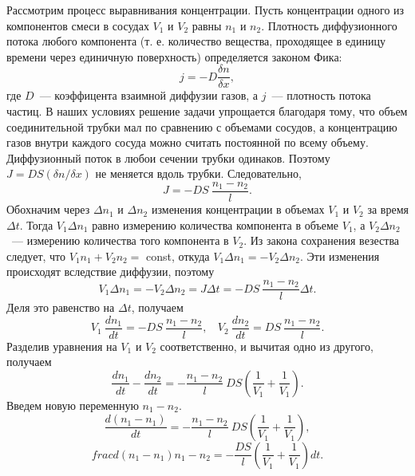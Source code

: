 \documentclass[a4paper,11pt]{article}
\begin{document}
Рассмотрим процесс выравнивания концентрации. Пусть концентрации одного из компонентов смеси в сосудах $V_{1}$ и $V_{2}$ равны $n_{1}$ и $n_{2}$. Плотность диффузионного потока любого компонента (т. е. количество вещества, проходящее в единицу времени через единичную поверхность) определяется законом Фика:
\begin{equation}\label{eq1}
  j = -D \frac{\delta n}{\delta x},
\end{equation}
где $D$~--- коэффицента взаимной диффузии газов, а $j$~--- плотность потока частиц. В наших условиях решение задачи упрощается благодаря тому, что объем соединительной трубки мал по сравнению с объемами сосудов, а концентрацию газов внутри каждого сосуда можно считать постоянной по всему объему. Диффузионный поток в любои сечении трубки одинаков. Поэтому $J = DS(\delta n/\delta x)$ не меняется вдоль трубки. Следовательно,
\begin{equation}\label{eq2}
  J = -DS\ \frac{n_{1} - n_{2}}{l}.
\end{equation}
Обохначим через $\Delta n_{1}$ и $\Delta n_{2}$ изменения концентрации в объемах $V_{1}$ и $V_{2}$ за время $\Delta t$. Тогда $V_{1} \Delta n_{1}$ равно измерению количества компонента в объеме $V_{1}$, а $V_{2} \Delta n_{2}$~--- измерению количества
того компонента в $V_{2}$. Из закона сохранения везества следует, что $V_{1}n_{1} + V_{2}n_{2} = $ const, откуда $V_{1} \Delta n_{1} = -V_{2} \Delta n_{2}$. Эти изменения происходят вследствие диффузии, поэтому
\begin{equation}\label{eq3}
  V_{1} \Delta n_{1} = -V_{2} \Delta n_{2} = J \Delta t = - DS\ \frac{n_{1} - n_{2}}{l} \Delta t.
\end{equation}
Деля это равенство на $\Delta t$, получаем
\begin{equation}\label{eq4}
  V_{1}\ \frac{dn_{1}}{dt} = -DS\ \frac{n_{1} - n_{2}}{l},\ \ \ \ V_{2}\ \frac{dn_{2}}{dt} = DS\ \frac{n_{1} - n_{2}}{l}.
\end{equation}
Разделив уравнения на $V_{1}$ и $V_{2}$ соответственно, и вычитая одно из другого, получаем
\begin{equation}\label{eq5}
\frac{dn_{1}}{dt} - \frac{dn_{2}}{dt} = -\frac{n_{1} - n_{2}}{l}\ DS \left(\frac{1}{V_{1}} + \frac{1}{V_{1}}\right).
\end{equation}
Введем новую переменную $n_{1} - n_{2}$.
\[\frac{d(n_{1} - n_{1})}{dt} = -\frac{n_{1} - n_{2}}{l}\ DS \left(\frac{1}{V_{1}} + \frac{1}{V_{1}}\right),\]
\[frac{d(n_{1} - n_{1})}{n_{1} - n_{2}} = -\frac{DS}{l} \left(\frac{1}{V_{1}} + \frac{1}{V_{1}}\right) dt.\]
\end{document}
